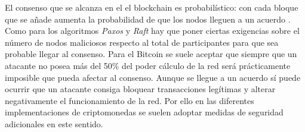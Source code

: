 El consenso que se alcanza en el el blockchain es probabilístico: con cada bloque que se añade aumenta la probabilidad de que los nodos lleguen a un acuerdo \citep{blockchain consensus}. Como para los algoritmos \textit{Paxos} y \textit{Raft} hay que poner ciertas exigencias sobre el número de nodos maliciosos respecto al total de participantes para que sea probable llegar al consenso. Para el Bitcoin se suele aceptar que siempre que un atacante no posea más del 50\% del poder cálculo de la red será prácticamente imposible que pueda afectar al consenso. Aunque se llegue a un acuerdo sí puede ocurrir que un atacante consiga bloquear transacciones legítimas y alterar negativamente el funcionamiento de la red. Por ello en las diferentes implementaciones de criptomonedas se suelen adoptar medidas de seguridad adicionales en este sentido.
 




